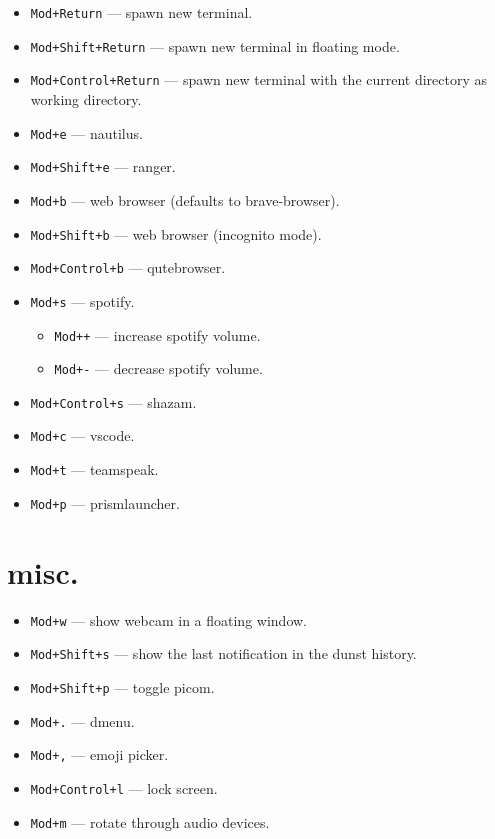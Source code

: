 \documentclass{article}
\begin{document}
\vspace*{-.5\baselineskip}
\begin{itemize}
  \item \texttt{Mod+Return} --- spawn new terminal.
  \item \texttt{Mod+Shift+Return} --- spawn new terminal in floating mode.
  \item \texttt{Mod+Control+Return} --- spawn new terminal with the current directory as working directory.
  \item \texttt{Mod+e} --- nautilus.
  \item \texttt{Mod+Shift+e} --- ranger.
  \item \texttt{Mod+b} --- web browser (defaults to brave-browser).
  \item \texttt{Mod+Shift+b} --- web browser (incognito mode).
  \item \texttt{Mod+Control+b} --- qutebrowser.
  \item \texttt{Mod+s} --- spotify.

    \vspace*{-\baselineskip}
    \begin{itemize}
      \item \texttt{Mod{\small+}+} --- increase spotify volume.
      \item \texttt{Mod{\small+}-} --- decrease spotify volume.
    \end{itemize}\vspace*{-.5\baselineskip}
  \item \texttt{Mod+Control+s} --- shazam.
  \item \texttt{Mod+c} --- vscode.
  \item \texttt{Mod+t} --- teamspeak.
  \item \texttt{Mod+p} --- prismlauncher.
\end{itemize}

\section*{misc.}

\vspace*{-.5\baselineskip}
\begin{itemize}
  \item \texttt{Mod+w} --- show webcam in a floating window.
  \item \texttt{Mod+Shift+s} --- show the last notification in the dunst history.
  \item \texttt{Mod+Shift+p} --- toggle picom.
  \item \texttt{Mod+.} --- dmenu.
  \item \texttt{Mod+,} --- emoji picker.
  \item \texttt{Mod+Control+l} --- lock screen.
  \item \texttt{Mod+m} --- rotate through audio devices.
\end{itemize}
\end{document}
